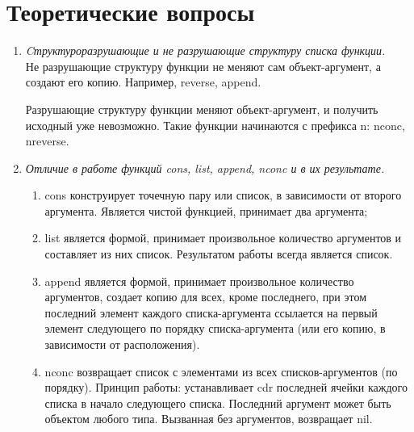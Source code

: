 \chapter{Теоретические вопросы}

\begin{enumerate}[wide=0pt]
\item \textit{Cтруктуроразрушающие и не разрушающие структуру списка функции.} \\
Не разрушающие структуру функции не меняют сам объект-аргумент, а создают его копию. Например, reverse, append.

Разрушающие структуру функции меняют объект-аргумент, и получить исходный уже невозможно. Такие функции начинаются с префикса n: nconc, nreverse. 
\item \textit{Отличие в работе функций cons, list, append, nconc и в их результате.} \\

\begin{enumerate}
	\item cons конструирует точечную пару или список, в зависимости от второго аргумента. Является чистой функцией, принимает два аргумента;
	\item list является формой, принимает произвольное количество аргументов и составляет из них список. Результатом работы всегда является список.
	\item append является формой, принимает произвольное количество аргументов, создает копию для всех, кроме последнего, при этом последний элемент каждого списка-аргумента ссылается на первый элемент следующего по порядку списка-аргумента (или его копию, в зависимости от расположения).
	\item nconc возвращает список с элементами из всех списков-аргументов (по порядку). Принцип работы: устанавливает cdr последней ячейки каждого списка в начало следующего списка. Последний аргумент может быть объектом любого типа. Вызванная без аргументов, возвращает nil.
\end{enumerate} 

   
\end{enumerate}
